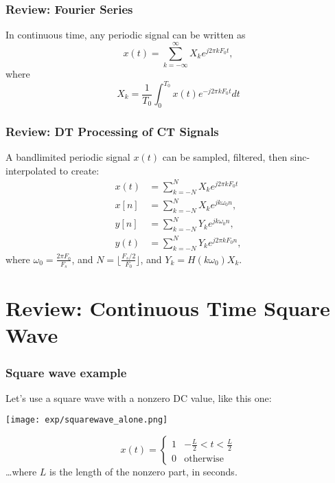 \documentclass{beamer}
\begin{document}
\begin{frame}
  \frametitle{Review: Fourier Series}

  In continuous time, any periodic signal can be written as
  \[
  x(t) = \sum_{k=-\infty}^\infty X_k e^{j2\pi k F_0 t},
  \]
  where
  \[
  X_k = \frac{1}{T_0}\int_0^{T_0}x(t)e^{-j2\pi kF_0t}dt
  \]
\end{frame}

\begin{frame}
  \frametitle{Review: DT Processing of CT Signals}

  A bandlimited periodic signal $x(t)$ can be sampled, filtered, then
  sinc-interpolated to create:
  \begin{align*}
    x(t)&=\sum_{k=-N}^{N}X_ke^{j2\pi kF_0t}\\
    x[n]&=\sum_{k=-N}^{N}X_ke^{jk\omega_0n},\\
    y[n]&=\sum_{k=-N}^{N}Y_ke^{jk\omega_0n},\\
    y(t)&=\sum_{k=-N}^{N}Y_ke^{j2\pi kF_0n},
  \end{align*}
  where $\omega_0=\frac{2\pi F_0}{F_s}$, and
  $N=\lfloor\frac{F_s/2}{F_0}\rfloor$, and $Y_k=H(k\omega_0)X_k$.
\end{frame}

\section[CT]{Review: Continuous Time Square Wave}
\setcounter{subsection}{1}

\begin{frame}
  \frametitle{Square wave example}
  Let's use a square wave with a nonzero DC value, like this one:
  \centerline{\texttt{[image: exp/squarewave\_alone.png]}}
  \[
  x(t) = \left\{\begin{array}{ll}
  1 & -\frac{L}{2} < t < \frac{L}{2} \\
  0 & \mbox{otherwise}
  \end{array}\right.
  \]
  \ldots where $L$ is the length of the nonzero part, in seconds.
\end{frame}
\end{document}
